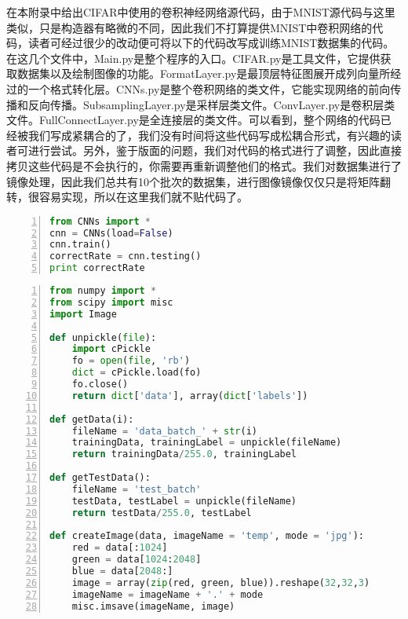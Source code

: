 %
在本附录中给出CIFAR中使用的卷积神经网络源代码，由于MNIST源代码与这里类似，只是构造器有略微的不同，因此我们不打算提供MNIST中卷积网络的代码，读者可经过很少的改动便可将以下的代码改写成训练MNIST数据集的代码。在这几个文件中，Main.py是整个程序的入口。CIFAR.py是工具文件，它提供获取数据集以及绘制图像的功能。FormatLayer.py是最顶层特征图展开成列向量所经过的一个格式转化层。CNNs.py是整个卷积网络的类文件，它能实现网络的前向传播和反向传播。SubsamplingLayer.py是采样层类文件。ConvLayer.py是卷积层类文件。FullConnectLayer.py是全连接层的类文件。可以看到，整个网络的代码已经被我们写成紧耦合的了，我们没有时间将这些代码写成松耦合形式，有兴趣的读者可进行尝试。另外，鉴于版面的问题，我们对代码的格式进行了调整，因此直接拷贝这些代码是不会执行的，你需要再重新调整他们的格式。我们对数据集进行了镜像处理，因此我们总共有10个批次的数据集，进行图像镜像仅仅只是将矩阵翻转，很容易实现，所以在这里我们就不贴代码了。

\begin{lstlisting}[language=Python,numbers=left, frame=shadowbox, rulesepcolor=\color{cadegrey}, caption=\text{FormatLayer.py}]
from CNNs import *
cnn = CNNs(load=False)
cnn.train()
correctRate = cnn.testing()
print correctRate
\end{lstlisting}


\newpage

\begin{lstlisting}[language=Python,numbers=left, frame=shadowbox, rulesepcolor=\color{cadegrey}, caption=\text{CIFAR.py}]
from numpy import *
from scipy import misc
import Image

def unpickle(file):
    import cPickle
    fo = open(file, 'rb')
    dict = cPickle.load(fo)
    fo.close()
    return dict['data'], array(dict['labels'])

def getData(i):
    fileName = 'data_batch_' + str(i)
    trainingData, trainingLabel = unpickle(fileName)
    return trainingData/255.0, trainingLabel

def getTestData():
    fileName = 'test_batch'
    testData, testLabel = unpickle(fileName)
    return testData/255.0, testLabel

def createImage(data, imageName = 'temp', mode = 'jpg'):
    red = data[:1024]
    green = data[1024:2048]
    blue = data[2048:]
    image = array(zip(red, green, blue)).reshape(32,32,3)
    imageName = imageName + '.' + mode
    misc.imsave(imageName, image)    
\end{lstlisting}



